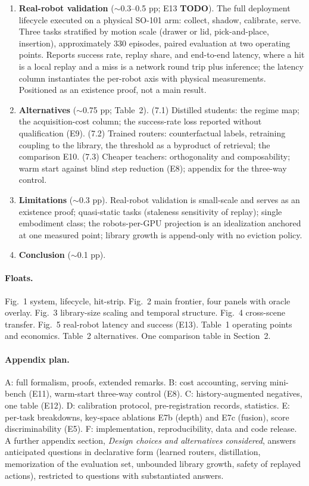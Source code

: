 \documentclass{article}
\newcommand{\TODO}{\colorbox{red!15}{\scriptsize\textbf{TODO}}}
\begin{document}
\begin{enumerate}[leftmargin=1.6em, itemsep=0.5em, topsep=0.3em]
\item \textbf{Real-robot validation} ($\sim$0.3--0.5 pp; E13 \TODO).
The full deployment lifecycle executed on a physical SO-101 arm: collect,
shadow, calibrate, serve. Three tasks stratified by motion scale (drawer or
lid, pick-and-place, insertion), approximately 330 episodes, paired evaluation
at two operating points. Reports success rate, replay share, and end-to-end
latency, where a hit is a local replay and a miss is a network round trip plus
inference; the latency column instantiates the per-robot axis with physical
measurements. Positioned as an existence proof, not a main result.

\item \textbf{Alternatives} ($\sim$0.75 pp; Table~2).
(7.1) Distilled students: the regime map; the acquisition-cost column; the
success-rate loss reported without qualification (E9).
(7.2) Trained routers: counterfactual labels, retraining coupling to the
library, the threshold as a byproduct of retrieval; the comparison E10.
(7.3) Cheaper teachers: orthogonality and composability; warm start against
blind step reduction (E8); appendix for the three-way control.

\item \textbf{Limitations} ($\sim$0.3 pp).
Real-robot validation is small-scale and serves as an existence proof;
quasi-static tasks (staleness sensitivity of replay); single embodiment
class; the robots-per-GPU projection is an idealization anchored at one
measured point; library growth is append-only with no eviction policy.

\item \textbf{Conclusion} ($\sim$0.1 pp).
\end{enumerate}

\paragraph{Floats.}
Fig.~1 system, lifecycle, hit-strip. Fig.~2 main frontier, four panels with
oracle overlay. Fig.~3 library-size scaling and temporal structure. Fig.~4
cross-scene transfer. Fig.~5 real-robot latency and success (E13). Table~1 operating points and economics. Table~2
alternatives. One comparison table in Section~2.

\paragraph{Appendix plan.}
A: full formalism, proofs, extended remarks. B: cost accounting, serving
mini-bench (E11), warm-start three-way control (E8). C: history-augmented
negatives, one table (E12). D: calibration protocol, pre-registration records,
statistics. E: per-task breakdowns, key-space ablations E7b (depth) and E7c (fusion),
score discriminability (E5). F: implementation, reproducibility, data and code
release. A further appendix section, \emph{Design choices and alternatives
considered}, answers anticipated questions in declarative form (learned
routers, distillation, memorization of the evaluation set, unbounded library
growth, safety of replayed actions), restricted to questions with substantiated
answers.
\end{document}
